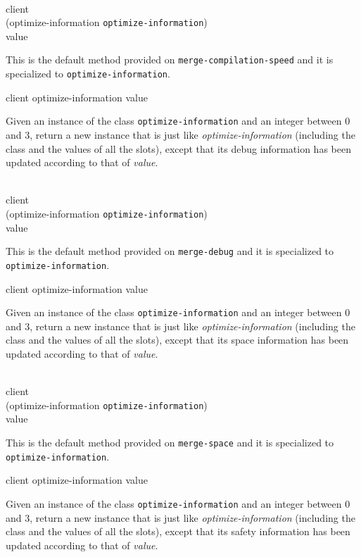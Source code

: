 \\
           {client\\
            (optimize-information {\tt optimize-information})\\
            value}

This is the default method provided on
\texttt{merge-compilation-speed} and it is specialized to
\texttt{optimize-information}.

 {client optimize-information value}

Given an instance of the class \texttt{optimize-information} and an
integer between $0$ and $3$, return a new instance that is just like
\textit{optimize-information} (including the class and the values of
all the slots), except that its debug information has been updated
according to that of \textit{value}.

\\
           {client\\
            (optimize-information {\tt optimize-information})\\
            value}

This is the default method provided on \texttt{merge-debug} and it is
specialized to \texttt{optimize-information}.

 {client optimize-information value}

Given an instance of the class \texttt{optimize-information} and an
integer between $0$ and $3$, return a new instance that is just like
\textit{optimize-information} (including the class and the values of
all the slots), except that its space information has been updated
according to that of \textit{value}.

\\
           {client\\
            (optimize-information {\tt optimize-information})\\
            value}

This is the default method provided on \texttt{merge-space} and it is
specialized to \texttt{optimize-information}.

 {client optimize-information value}

Given an instance of the class \texttt{optimize-information} and an
integer between $0$ and $3$, return a new instance that is just like
\textit{optimize-information} (including the class and the values of
all the slots), except that its safety information has been updated
according to that of \textit{value}.

